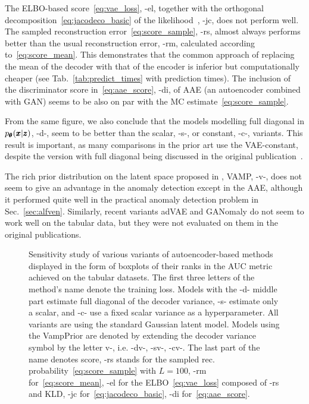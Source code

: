The ELBO-based score~\eqref{eq:vae_loss},  -el, together with the orthogonal decomposition~\eqref{eq:jacodeco_basic} of the likelihood~\cite{pidhorskyi2018generative}, -jc, does not perform well. The sampled reconstruction error~\eqref{eq:score_sample}, \mbox{-rs}, almost always performs better than the usual reconstruction error, -rm, calculated according to~\eqref{eq:score_mean}. This demonstrates that the common approach of replacing the mean of the decoder with that of the encoder is inferior but computationally cheaper (see Tab.~\ref{tab:predict_times} with prediction times). The inclusion of the discriminator score in~\eqref{eq:aae_score}, -di, of AAE (an autoencoder combined with GAN) seems to be also on par with the MC estimate~\eqref{eq:score_sample}. 

From the same figure, we also conclude that the models modelling full diagonal in $p_{\pmb{{\theta}}}(\pmb{{x}}|\pmb{{z}})$, -d-, seem to be better than the scalar, -s-, or constant, -c-, variants. This result is important, as many comparisons in the prior art use the VAE-constant, despite the version with full diagonal being discussed in the original publication~\cite{kingma2013auto}.

The rich prior distribution on the latent space proposed in \cite{tomczak2018vae}, VAMP, -v-, does not seem to give an advantage in the anomaly detection except in the AAE, although it performed quite well in the practical anomaly detection problem in Sec.~\ref{sec:alfven}. Similarly, recent variants adVAE and GANomaly do not seem to work well on the tabular data, but they were not evaluated on them in the original publications.

\begin{figure}
    \centering
    \small
    
    \caption{Sensitivity study of various variants of  autoencoder-based methods displayed in the form of boxplots of their ranks in the AUC metric achieved on the tabular datasets. The first three letters of the method's name denote the training loss. Models with the -d- middle part estimate full diagonal of the decoder variance, -s- estimate only a scalar, and -c-  use a fixed scalar variance as a hyperparameter. All variants are using the standard Gaussian latent model. Models using the VampPrior are denoted by extending the decoder variance symbol by the letter v-, i.e. -dv-, -sv-, -cv-. The last part of the name denotes score, -rs stands for the sampled rec. probability~\eqref{eq:score_sample} with $L=100$, -rm for~\eqref{eq:score_mean}, -el for the ELBO~\eqref{eq:vae_loss} composed of -rs and KLD, -jc for~\eqref{eq:jacodeco_basic}, -di for~\eqref{eq:aae_score}.}
    \label{fig:tabular_ae_only_box_auc_meanmax}
\end{figure}


